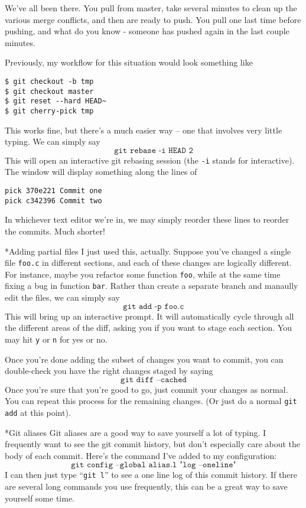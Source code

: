 \documentclass{amsart}
\makeatletter
\renewcommand\subsection{\@startsection{subsection}{2}%
  \z@{-.5\linespacing\@plus-.7\linespacing}{.5\linespacing}%
  {\normalfont\scshape}}
\makeatother
\begin{document}
We've all been there. You pull from master, take several minutes to
clean up the various merge conflicts, and then are ready to push. You
pull one last time before pushing, and what do you know - someone has
pushed again in the last couple minutes.

Previously, my workflow for this situation would look something like
\begin{verbatim}
$ git checkout -b tmp
$ git checkout master
$ git reset --hard HEAD~
$ git cherry-pick tmp
\end{verbatim}

This works fine, but there’s a much easier way -- one that involves
very little typing. We can simply say
\[
  \texttt{git rebase -i HEAD~2}
\]
This will open an interactive git rebasing session (the \texttt{-i}
stands for interactive). The window will display something along the
lines of
\begin{verbatim}
pick 370e221 Commit one
pick c342396 Commit two
\end{verbatim}
In whichever text editor we’re in, we may simply reorder these lines
to reorder the commits. Much shorter!

\subsection*{Adding partial files}
I just used this, actually. Suppose you’ve changed a single file
\texttt{foo.c} in different sections, and each of these changes are
logically different. For instance, maybe you refactor some function
\texttt{foo}, while at the same time fixing a bug in function
\texttt{bar}. Rather than create a separate branch and manaully edit
the files, we can simply say
\[
  \texttt{git add -p foo.c}
\]
This will bring up an interactive prompt. It will automatically cycle
through all the different areas of the diff, asking you if you want to
stage each section. You may hit \texttt{y} or \texttt{n} for yes or
no.

Once you’re done adding the subset of changes you want to commit, you
can double-check you have the right changes staged by saying
\[
  \texttt{git diff --cached}
\]
Once you’re sure that you’re good to go, just commit your changes as
normal. You can repeat this process for the remaining changes. (Or
just do a normal \texttt{git add} at this point).

\subsection*{Git aliases}
Git aliases are a good way to save yourself a lot of typing. I
frequently want to see the git commit history, but don’t especially
care about the body of each commit. Here’s the command I’ve added to
my configuration:
\[
  \texttt{git config --global alias.l "log --oneline"}
\]
I can then just type “\texttt{git l}” to see a one line log of this
commit history. If there are several long commands you use frequently,
this can be a great way to save yourself some time.
\end{document}
